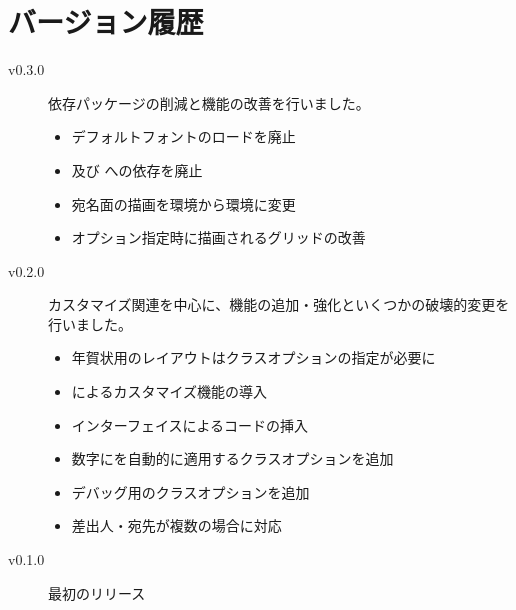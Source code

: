 \documentclass{hagaki-doc}
\begin{document}
\section{バージョン履歴}

\begin{description}
  \item[v0.3.0] 依存パッケージの削減と機能の改善を行いました。
    \leavevmode
    \begin{itemize}
      \item デフォルトフォントのロードを廃止
      \item {}及び への依存を廃止
      \item 宛名面の描画を環境から環境に変更
      \item {}オプション指定時に描画されるグリッドの改善
    \end{itemize}
  \item[v0.2.0] カスタマイズ関連を中心に、機能の追加・強化といくつかの破壊的変更を行いました。
    \leavevmode
    \begin{itemize}
      \item 年賀状用のレイアウトはクラスオプションの指定が必要に
      \item {}によるカスタマイズ機能の導入
      \item {}インターフェイスによるコードの挿入
      \item 数字にを自動的に適用するクラスオプションを追加
      \item デバッグ用のクラスオプションを追加
      \item 差出人・宛先が複数の場合に対応
    \end{itemize}
  \item[v0.1.0] 最初のリリース
\end{description}
\end{document}
